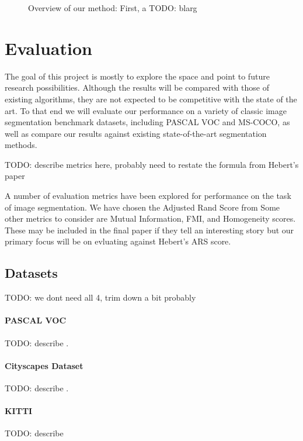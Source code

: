 \documentclass[twocolumn]{article}
\newcommand{\todo}[1]{}
\renewcommand{\todo}[1]{{\color{red} TODO: {#1}}}
\newcommand{\seclab}[1]{\label{sec:#1}}
\newcommand{\figlab}[1]{\label{fig:#1}}
\begin{document}
\begin{figure}
  \caption{
    Overview of our method: First, a \todo{blarg}
  }
  \figlab{process}

\end{figure}

\section{Evaluation}\seclab{eval}

The goal of this project is mostly to explore the space and point to future
research possibilities. Although the results will be compared with those of
existing algorithms, they are not expected to be competitive with the state of
the art. To that end we will evaluate our performance on a variety of classic
image segmentation benchmark datasets, including PASCAL VOC and MS-COCO, as well
as compare our results against existing state-of-the-art segmentation methods. 

\todo{describe metrics here, probably need to restate the formula from Hebert's paper}

A number of evaluation metrics have been explored for performance on the task of
image segmentation. We have chosen the Adjusted Rand Score from
\cite{unnikrishnan2005measure}  Some other metrics to consider are Mutual
Information, FMI, and Homogeneity scores. These may be included in the final
paper if they tell an interesting story but our primary focus will be on
evluating against Hebert's ARS score.

\subsection{Datasets}\seclab{data}

\todo{we dont need all 4, trim down a bit probably}

\paragraph{PASCAL VOC} \todo{describe} \cite{Everingham10}.

\paragraph{Cityscapes Dataset} \todo{describe} \cite{cordts2016cityscapes}.

\paragraph{KITTI} \todo{describe} \cite{geiger2012we}
\end{document}
